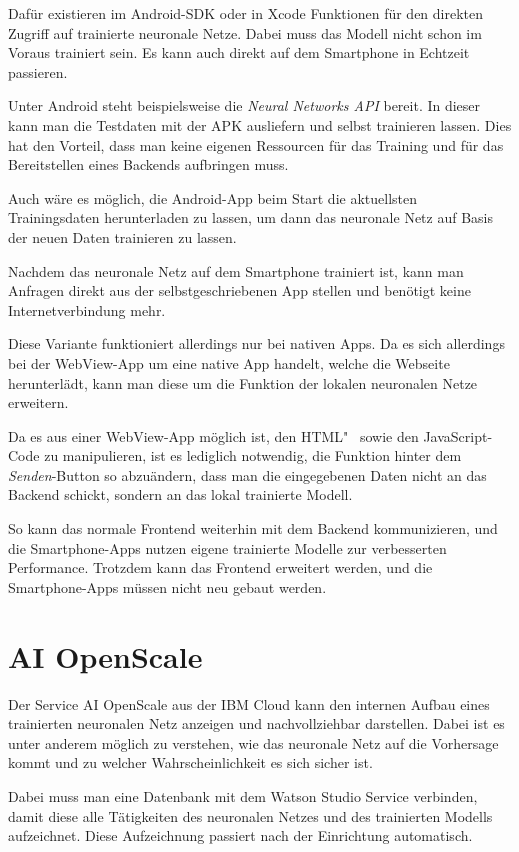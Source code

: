Dafür existieren im Android-SDK oder in Xcode Funktionen für den direkten Zugriff auf trainierte neuronale Netze. Dabei
muss das Modell nicht schon im Voraus trainiert sein. Es kann auch direkt auf dem Smartphone in Echtzeit passieren.

Unter Android steht beispielsweise die \textit{Neural Networks API} bereit. In dieser kann man die Testdaten mit der APK
ausliefern und selbst trainieren lassen. Dies hat den Vorteil, dass man keine eigenen Ressourcen für das Training und
für das Bereitstellen eines Backends aufbringen muss.

Auch wäre es möglich, die Android-App beim Start die aktuellsten Trainingsdaten herunterladen zu lassen, um dann das
neuronale Netz auf Basis der neuen Daten trainieren zu lassen.

Nachdem das neuronale Netz auf dem Smartphone trainiert ist, kann man Anfragen direkt aus der selbstgeschriebenen App
stellen und benötigt keine Internetverbindung mehr.

Diese Variante funktioniert allerdings nur bei nativen Apps. Da es sich allerdings bei der WebView-App um eine native
App handelt, welche die Webseite herunterlädt, kann man diese um die Funktion der lokalen neuronalen Netze erweitern.

Da es aus einer WebView-App möglich ist, den HTML"~ sowie den JavaScript-Code zu manipulieren, ist es lediglich
notwendig, die Funktion hinter dem \textit{Senden}-Button so abzuändern, dass man die eingegebenen Daten nicht an das
Backend schickt, sondern an das lokal trainierte Modell.

So kann das normale Frontend weiterhin mit dem Backend kommunizieren, und die Smartphone-Apps nutzen eigene trainierte
Modelle zur verbesserten Performance. Trotzdem kann das Frontend erweitert werden, und die Smartphone-Apps müssen nicht
neu gebaut werden.

\section{AI OpenScale}
\label{ai_openscale}
Der Service AI OpenScale aus der IBM Cloud kann den internen Aufbau eines trainierten neuronalen Netz anzeigen und
nachvollziehbar darstellen. Dabei ist es unter anderem möglich zu verstehen, wie das neuronale Netz auf die Vorhersage
kommt und zu welcher Wahrscheinlichkeit es sich sicher ist.

Dabei muss man eine Datenbank mit dem Watson Studio Service verbinden, damit diese alle Tätigkeiten des neuronalen
Netzes und des trainierten Modells aufzeichnet. Diese Aufzeichnung passiert nach der Einrichtung automatisch.


